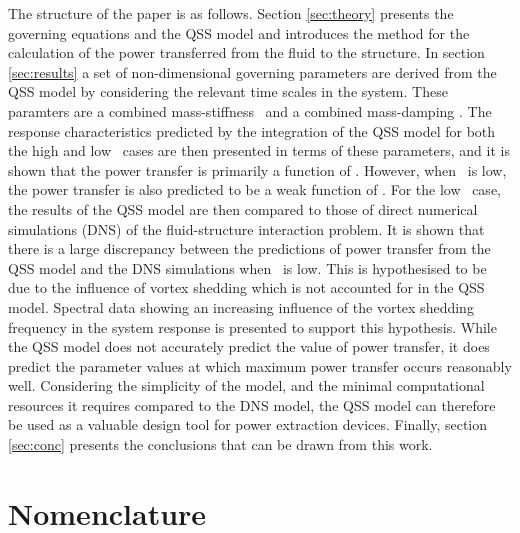 The structure of the paper is as follows. Section \ref{sec:theory} presents the governing equations and the QSS model and introduces the method for the calculation of the power transferred from the fluid to the structure. In section \ref{sec:results} a set of non-dimensional governing parameters are derived from the QSS model by considering the relevant time scales in the system. These paramters are a combined mass-stiffness \massstiff \  and a combined mass-damping \massdamp. The response characteristics predicted by the integration of the QSS model for both the high and low \reynoldsnumber\ cases are then presented in terms of these parameters, and it is shown that the power transfer is primarily a function of \massdamp. However, when \massstiff\ is low, the power transfer is also predicted to be a weak function of \massstiff. For the low \reynoldsnumber\ case, the results of the QSS model are then compared to those of direct numerical simulations (DNS) of the fluid-structure interaction problem. It is shown that there is a large discrepancy between the predictions of power transfer from the QSS model and the DNS simulations when \massstiff\ is low. This is hypothesised to be due to the influence of vortex shedding which is not accounted for in the QSS model. Spectral data showing an increasing influence of the vortex shedding frequency in the system response is presented to support this hypothesis. While the QSS model does not accurately predict the value of power transfer, it does predict the parameter values at which maximum power transfer occurs reasonably well. Considering the simplicity of the model, and the minimal computational resources it requires compared to the DNS model, the QSS model can therefore be used as a valuable design tool for power extraction devices. Finally, section \ref{sec:conc} presents the conclusions that can be drawn from this work.
\section*{Nomenclature}


